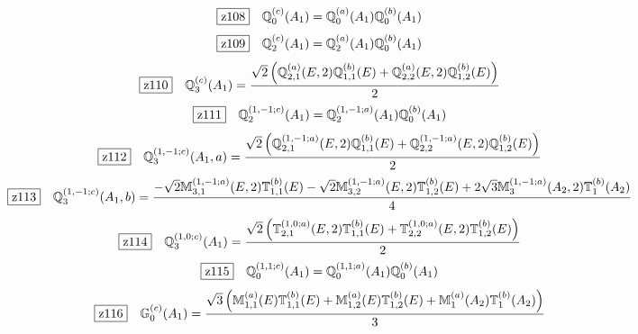 \documentclass[fleqn,10pt,landscape]{jsarticle}
\begin{document}
\begin{dmath*}
\hspace*{3mm}\fbox{z108}\quad \mathbb{Q}_{0}^{(c)}(A_{1})=\mathbb{Q}_{0}^{(a)}(A_{1}) \mathbb{Q}_{0}^{(b)}(A_{1})
\end{dmath*}
\begin{dmath*}
\hspace*{3mm}\fbox{z109}\quad \mathbb{Q}_{2}^{(c)}(A_{1})=\mathbb{Q}_{2}^{(a)}(A_{1}) \mathbb{Q}_{0}^{(b)}(A_{1})
\end{dmath*}
\begin{dmath*}
\hspace*{3mm}\fbox{z110}\quad \mathbb{Q}_{3}^{(c)}(A_{1})=\frac{\sqrt{2} \left(\mathbb{Q}_{2,1}^{(a)}(E,2) \mathbb{Q}_{1,1}^{(b)}(E) + \mathbb{Q}_{2,2}^{(a)}(E,2) \mathbb{Q}_{1,2}^{(b)}(E)\right)}{2}
\end{dmath*}
\begin{dmath*}
\hspace*{3mm}\fbox{z111}\quad \mathbb{Q}_{2}^{(1,-1;c)}(A_{1})=\mathbb{Q}_{2}^{(1,-1;a)}(A_{1}) \mathbb{Q}_{0}^{(b)}(A_{1})
\end{dmath*}
\begin{dmath*}
\hspace*{3mm}\fbox{z112}\quad \mathbb{Q}_{3}^{(1,-1;c)}(A_{1},a)=\frac{\sqrt{2} \left(\mathbb{Q}_{2,1}^{(1,-1;a)}(E,2) \mathbb{Q}_{1,1}^{(b)}(E) + \mathbb{Q}_{2,2}^{(1,-1;a)}(E,2) \mathbb{Q}_{1,2}^{(b)}(E)\right)}{2}
\end{dmath*}
\begin{dmath*}
\hspace*{3mm}\fbox{z113}\quad \mathbb{Q}_{3}^{(1,-1;c)}(A_{1},b)=\frac{- \sqrt{2} \mathbb{M}_{3,1}^{(1,-1;a)}(E,2) \mathbb{T}_{1,1}^{(b)}(E) - \sqrt{2} \mathbb{M}_{3,2}^{(1,-1;a)}(E,2) \mathbb{T}_{1,2}^{(b)}(E) + 2 \sqrt{3} \mathbb{M}_{3}^{(1,-1;a)}(A_{2},2) \mathbb{T}_{1}^{(b)}(A_{2})}{4}
\end{dmath*}
\begin{dmath*}
\hspace*{3mm}\fbox{z114}\quad \mathbb{Q}_{3}^{(1,0;c)}(A_{1})=\frac{\sqrt{2} \left(\mathbb{T}_{2,1}^{(1,0;a)}(E,2) \mathbb{T}_{1,1}^{(b)}(E) + \mathbb{T}_{2,2}^{(1,0;a)}(E,2) \mathbb{T}_{1,2}^{(b)}(E)\right)}{2}
\end{dmath*}
\begin{dmath*}
\hspace*{3mm}\fbox{z115}\quad \mathbb{Q}_{0}^{(1,1;c)}(A_{1})=\mathbb{Q}_{0}^{(1,1;a)}(A_{1}) \mathbb{Q}_{0}^{(b)}(A_{1})
\end{dmath*}
\begin{dmath*}
\hspace*{3mm}\fbox{z116}\quad \mathbb{G}_{0}^{(c)}(A_{1})=\frac{\sqrt{3} \left(\mathbb{M}_{1,1}^{(a)}(E) \mathbb{T}_{1,1}^{(b)}(E) + \mathbb{M}_{1,2}^{(a)}(E) \mathbb{T}_{1,2}^{(b)}(E) + \mathbb{M}_{1}^{(a)}(A_{2}) \mathbb{T}_{1}^{(b)}(A_{2})\right)}{3}
\end{dmath*}
\end{document}
